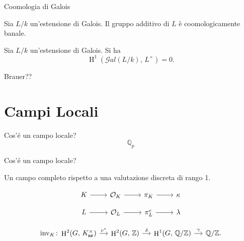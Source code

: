 \documentclass{beamer}
\newcommand{\Z}{\mathbb{Z}}
\newcommand{\Q}{\mathbb{Q}}
\newcommand{\Qp}{\mathbb{Q}_p}
\newcommand{\K}{K}
\newcommand{\knr}{K_\mathtt{nr}}
\newcommand{\Gal}[1]{\mathcal{G}al\left( #1 \right)}
\DeclareMathOperator{\inv}{inv}
\DeclareMathOperator{\HH}{H}
\begin{document}

\begin{frame}{Coomologia di Galois}
\begin{theorem} \label{Hadd}
Sia $ L / k $ un'estensione di Galois. Il gruppo additivo di $ L $ è coomologicamente banale.
\end{theorem}
\begin{theorem}[Hilbert 90]\label{H90}
Sia $ L/k $ un'estensione di Galois. Si ha
\[ \HH^1(\Gal{ L / k}, \, L^\times) = 0. \]
\end{theorem}
Brauer??
\end{frame}

\section{Campi Locali}

\begin{frame}{Cos'é un campo locale?}
\Huge
\[ \Qp \]
\end{frame}

\begin{frame}[fragile]{Cos'é un campo locale?}
	\begin{definition}
		Un campo completo rispetto a una valutazione discreta di rango 1.
	\end{definition}

	\[ \begin{tikzcd}[row sep = small]
	K \rar & \mathcal{O}_K \rar & \pi_K \rar & \kappa \\
	L \rar & \mathcal{O}_L \rar & \pi_L^e \rar& \lambda
	\end{tikzcd} \]
	

	
	\[ \begin{tikzcd}[column sep = small]
	\inv_\K \colon \HH^2(G, \, \knr^\times)  \rar["v^*"]
	& \HH^2(G, \, \Z) \rar["\delta"]
	& \HH^1(G, \, \Q/\Z) \rar["\gamma"]
	& \Q/\Z.
	\end{tikzcd} \]
\end{frame}
\end{document}

